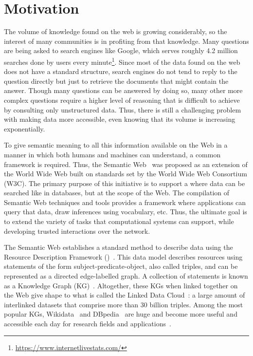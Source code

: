 \section{Motivation}
The volume of knowledge found on the web is growing considerably, so the interest of many 
communities is in profiting from that knowledge. Many questions are being asked  
to search engines like Google, which serves roughly 4.2 million searches done by users every 
minute\footnote{\href{https://www.internetlivestats.com/}{https://www.internetlivestats.com/}}. 
Since most of the data found on the web does not have a standard structure, 
search engines do not tend to reply to the question directly but just to retrieve the documents 
that might contain the answer. Though many questions can be answered by doing so, many 
other more complex questions require a higher level of reasoning that is difficult to achieve 
by consulting only unstructured data. Thus, there is still a challenging problem with making 
data more accessible, even knowing that its volume is increasing exponentially.

To give semantic meaning to all this information available on the Web in a manner in which both 
humans and machines can understand, a common framework is required. Thus, 
the Semantic Web~\cite{key:semwebsa} was proposed as an extension of the World Wide Web built on 
standards set by the World Wide Web Consortium (W3C). The primary purpose of this 
initiative is to support a  where data can be searched like in databases, but 
at the scope of the Web. The compilation of Semantic Web techniques and tools provides 
a framework where applications can query that data, draw inferences using vocabulary, etc. 
Thus, the ultimate goal is to extend the variety of tasks that computational systems can 
support, while developing trusted interactions over the network. 

The Semantic Web establishes a standard method to describe data using the Resource 
Description Framework (\RDF)~\cite{key:rdfprimer11}. This data model describes resources using 
statements of the form subject-predicate-object, also called triples, and can be represented as a 
directed edge-labelled graph. A collection of \RDF{} statements is known as a Knowledge Graph 
(KG)~\cite{key:ldbook}. Altogether, these KGs when linked together on the Web give shape to what is 
called the Linked Data Cloud~\cite{key:ldprinciples}: a large amount of interlinked \RDF{} datasets that 
comprise more than 30 billion \RDF{} triples. Among the most popular KGs, Wikidata~\cite{KG:wikidata} and 
DBpedia~\cite{KG:dbpedia} are huge and become more useful and accessible each day for research fields 
and applications~\cite{wikidata:usage-MalyshevKGGB18, EL:dbpedia-spotlight-MendesJGB11}. 

